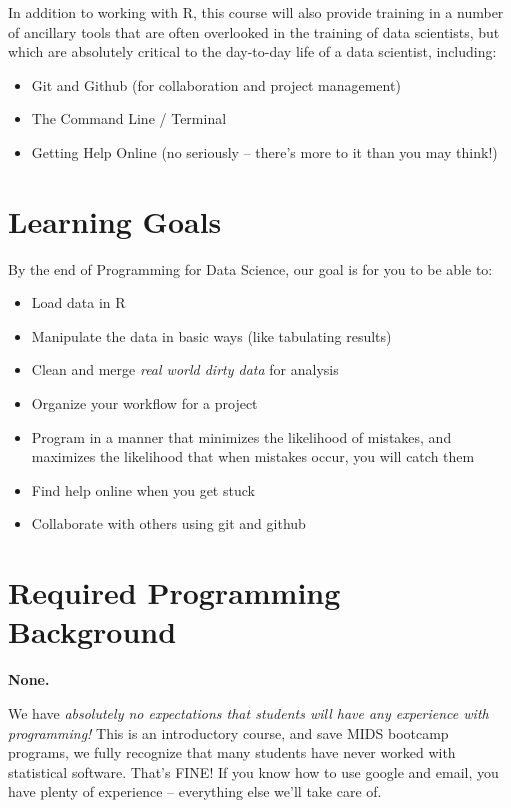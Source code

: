 \documentclass[12pt]{article}
\begin{document}
In addition to working with R, this course will also provide training in a number of ancillary tools that are often overlooked in the training of data scientists, but which are absolutely critical to the day-to-day life of a data scientist, including:

\begin{itemize}
	\item Git and Github (for collaboration and project management)
	\item The Command Line / Terminal
	\item Getting Help Online (no seriously -- there's more to it than you may think!)
\end{itemize}


\section{Learning Goals}
By the end of Programming for Data Science, our goal is for you to be able to:

\begin{itemize}
    \item Load data in R
    \item Manipulate the data in basic ways (like tabulating results)
	\item Clean and merge \emph{real world dirty data} for analysis
	\item Organize your workflow for a project
	\item Program in a manner that minimizes the likelihood of mistakes, and maximizes the likelihood that when mistakes occur, you will catch them
    \item Find help online when you get stuck
	\item Collaborate with others using git and github
\end{itemize}

\section{Required Programming Background}

{\color{red}\textbf{None.}}

We have \emph{absolutely no expectations that students will have any experience with programming!} This is an introductory course, and save MIDS bootcamp programs, we fully recognize that many students have never worked with statistical software. That's FINE! If you know how to use google and email, you have plenty of experience -- everything else we'll take care of.
\end{document}
